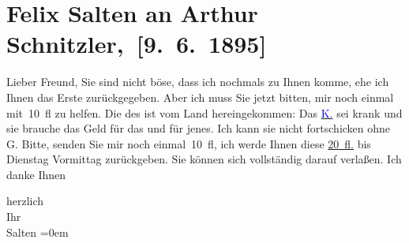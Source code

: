 

\renewcommand{\erwaehntePersonen}{Personen:  ?? [Kostfrau von Charlotte Lamberg], Maria Charlotte Lamberg, Charlotte Pohl-Glas}
\renewcommand{\erwaehnteOrte}{Orte: Wien}
\renewcommand{\erwaehnteWerke}{}
\section[ Felix Salten an Arthur Schnitzler, {[}9. 6. 1895{]}]{Felix Salten an Arthur Schnitzler, {[}9. 6. 1895{]}}
\nopagebreak{}
\rehead{ }\normalsize\beginnumbering{}
\toendnotes[C]{\smallbreak\pagebreak[2]}
\toendnotes[C]{\smallbreak}
\pstart
           \noindent{}{\pb}Lieber Freund, Sie sind nicht böse, dass ich nochmals
               zu Ihnen komme, ehe ich Ihnen das Erste zurückgegeben. Aber ich muss Sie jetzt
               bitten, mir noch einmal mit 10 fl zu helfen. Die \label{K_L03156-1v}\label{K_L03156-1h} des \label{K_L03156-2v}\label{K_L03156-2h} ist vom
               Land hereingekommen: Das \uline{\textcolor{blue}{K.}{}\ledrightnote{{$\rightarrow$}\textcolor{blue}{Maria Charlotte Lamberg}}} sei krank und sie brauche das Geld für das und für jenes. Ich kann sie nicht
               fortschicken ohne G. Bitte, senden Sie mir noch einmal 10 fl, ich {\pb}werde Ihnen diese \uline{20 fl.} bis Dienstag{ }Vormittag{ } zurückgeben. Sie können sich vollständig
               darauf verlaßen. Ich danke Ihnen \pend
           
\pstart
           herzlich {\\[\baselineskip]}Ihr {\\[\baselineskip]}\spacefill\mbox{Salten}\pend
           \leftskip=0em{}\endnumbering{}  
      
